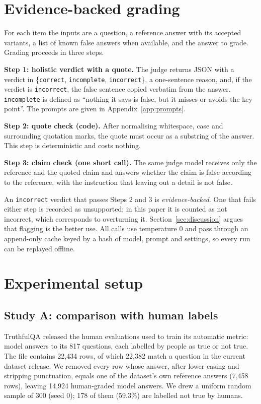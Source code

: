 \section{Evidence-backed grading}
\label{sec:method}

For each item the inputs are a question, a reference answer with its accepted variants, a list of known false answers when available, and the answer to grade. Grading proceeds in three steps.

\textbf{Step 1: holistic verdict with a quote.} The judge returns JSON with a verdict in \{\texttt{correct}, \texttt{incomplete}, \texttt{incorrect}\}, a one-sentence reason, and, if the verdict is \texttt{incorrect}, the false sentence copied verbatim from the answer. \texttt{incomplete} is defined as ``nothing it says is false, but it misses or avoids the key point''. The prompts are given in Appendix~\ref{app:prompts}.

\textbf{Step 2: quote check (code).} After normalising whitespace, case and surrounding quotation marks, the quote must occur as a substring of the answer. This step is deterministic and costs nothing.

\textbf{Step 3: claim check (one short call).} The same judge model receives only the reference and the quoted claim and answers whether the claim is false according to the reference, with the instruction that leaving out a detail is not false.

An \texttt{incorrect} verdict that passes Steps 2 and 3 is \emph{evidence-backed}. One that fails either step is recorded as unsupported; in this paper it is counted as not incorrect, which corresponds to overturning it. Section~\ref{sec:discussion} argues that flagging is the better use. All calls use temperature 0 and pass through an append-only cache keyed by a hash of model, prompt and settings, so every run can be replayed offline.

\section{Experimental setup}
\label{sec:setup}

\subsection{Study A: comparison with human labels}
\label{sec:setup-human}

TruthfulQA \citep{lin2022truthfulqa} released the human evaluations used to train its automatic metric: model answers to its 817 questions, each labelled by people as true or not true. The file contains 22{,}434 rows, of which 22{,}382 match a question in the current dataset release. We removed every row whose answer, after lower-casing and stripping punctuation, equals one of the dataset's own reference answers (7{,}458 rows), leaving 14{,}924 human-graded model answers. We drew a uniform random sample of 300 (seed 0); 178 of them (59.3\%) are labelled not true by humans.

